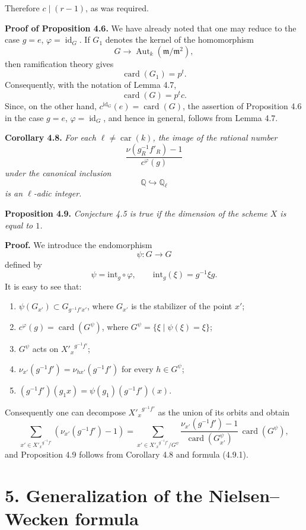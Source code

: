 \documentclass[11pt]{article}
\providecommand{\fm}{\mathfrak{m}}
\providecommand{\car}{\operatorname{car}}
\providecommand{\id}{\operatorname{id}}
\providecommand{\id}{\operatorname{id}}
\providecommand{\id}{\operatorname{id}}
\providecommand{\Aut}{\operatorname{Aut}}
\providecommand{\car}{\operatorname{car}}
\providecommand{\id}{\operatorname{id}}
\providecommand{\id}{\operatorname{id}}
\providecommand{\bQ}{\mathbb Q}
\providecommand{\fm}{\mathfrak m}
\providecommand{\card}{\operatorname{card}}
\providecommand{\Aut}{\operatorname{Aut}}
\providecommand{\car}{\operatorname{car}}
\providecommand{\id}{\operatorname{id}}
\begin{document}
Therefore $c\mid(r-1)$, as was required.

\medskip
\noindent
\textbf{Proof of Proposition 4.6.} We have already noted that one may reduce to the case $g=e$, $\varphi=\id_G$. If $G_1$ denotes the kernel of the homomorphism
\[
G\longrightarrow\Aut_k(\fm/\fm^2),
\]
then ramification theory gives
\[
\card(G_1)=p^t.
\]
Consequently, with the notation of Lemma 4.7,
\[
\card(G)=p^tc.
\]
Since, on the other hand, $c^{\id_G}(e)=\card(G)$, the assertion of Proposition 4.6 in the case $g=e$, $\varphi=\id_G$, and hence in general, follows from Lemma 4.7.

\medskip
\noindent
\textbf{Corollary 4.8.} \emph{For each $\ell\ne\car(k)$, the image of the rational number
\[
\frac{\nu(g_R^{-1}f'_R)-1}{c^\varphi(g)}
\]
under the canonical inclusion
\[
\bQ\hookrightarrow \bQ_\ell
\]
is an $\ell$-adic integer.}

\medskip
\noindent
\textbf{Proposition 4.9.} \emph{Conjecture 4.5 is true if the dimension of the scheme $X$ is equal to $1$.}

\medskip
\noindent
\textbf{Proof.} We introduce the endomorphism
\[
\psi:G\longrightarrow G
\]
defined by
\[
\psi=\mathrm{int}_g\circ\varphi,
\qquad \mathrm{int}_g(\xi)=g^{-1}\xi g.
\]
It is easy to see that:
\begin{enumerate}
\item[i)] $\psi(G_{x'})\subset G_{g^{-1}f'x'}$, where $G_{x'}$ is the stabilizer of the point $x'$;
\item[ii)] $c^\varphi(g)=\card(G^\psi)$, where $G^\psi=\{\xi\mid\psi(\xi)=\xi\}$;
\item[iii)] $G^\psi$ acts on ${X'_x}^{g^{-1}f'}$;
\item[iv)] $\nu_{x'}(g^{-1}f')=\nu_{hx'}(g^{-1}f')$ for every $h\in G^\psi$;
\item[v)] $(g^{-1}f')(g_1x)=\psi(g_1)(g^{-1}f')(x)$.
\end{enumerate}
Consequently one can decompose ${X'_x}^{g^{-1}f'}$ as the union of its orbits and obtain
\begin{equation}\tag{4.9.1}
\sum_{x'\in {X'_x}^{g^{-1}f'}}(\nu_{x'}(g^{-1}f')-1)
=
\sum_{x'\in {X'_x}^{g^{-1}f'}/G^\psi}
\frac{\nu_{x'}(g^{-1}f')-1}{\card(G^\psi_{x'})}\,\card(G^\psi),
\end{equation}
and Proposition 4.9 follows from Corollary 4.8 and formula (4.9.1).

\section*{5. Generalization of the Nielsen--Wecken formula}
\end{document}
